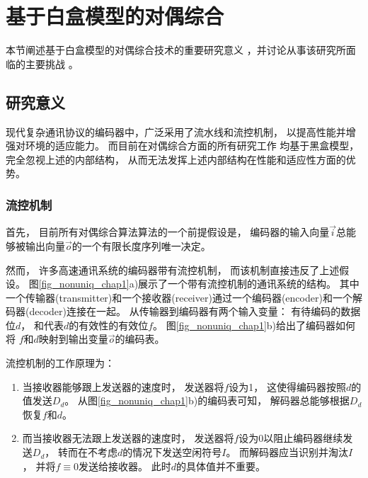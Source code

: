 \section{基于白盒模型的对偶综合}\label{sec_whiteboxtodo}
本节阐述基于白盒模型的对偶综合技术的重要研究意义
，并讨论从事该研究所面临的主要挑战
。



\subsection{研究意义}

现代复杂通讯协议的编码器中，广泛采用了流水线和流控机制，
以提高性能并增强对环境的适应能力。
而目前在对偶综合方面的所有研究工作
均基于黑盒模型，
完全忽视上述的内部结构，
从而无法发挥上述内部结构在性能和适应性方面的优势。

\subsubsection{流控机制}
首先，
目前所有对偶综合算法算法的一个前提假设是，
编码器的输入向量$\vec{i}$总能够被输出向量$\vec{o}$的一个有限长度序列唯一决定。

然而，
许多高速通讯系统的编码器带有流控机制，
而该机制直接违反了上述假设。
图\ref{fig_nonuniq_chap1}a)展示了一个带有流控机制的通讯系统的结构。
其中一个传输器(transmitter)和一个接收器(receiver)通过一个编码器(encoder)和一个解码器(decoder)连接在一起。
从传输器到编码器有两个输入变量：
有待编码的数据位$d$，
和代表$d$的有效性的有效位$f$。
图\ref{fig_nonuniq_chap1}b)给出了编码器如何将
$f$和$d$映射到输出变量$\vec{o}$的编码表。

流控机制的工作原理为：
\begin{enumerate}
\item
当接收器能够跟上发送器的速度时，
发送器将$f$设为1，
这使得编码器按照$d$的值发送$D_d$。
从图\ref{fig_nonuniq_chap1}b)的编码表可知，
解码器总能够根据$D_d$恢复$f$和$d$。
\item
而当接收器无法跟上发送器的速度时，
发送器将$f$设为0以阻止编码器继续发送$D_d$，
转而在不考虑$d$的情况下发送空闲符号$I$。
而解码器应当识别并淘汰$I$，
并将$f\equiv 0$发送给接收器。
此时$d$的具体值并不重要。
\end{enumerate}

